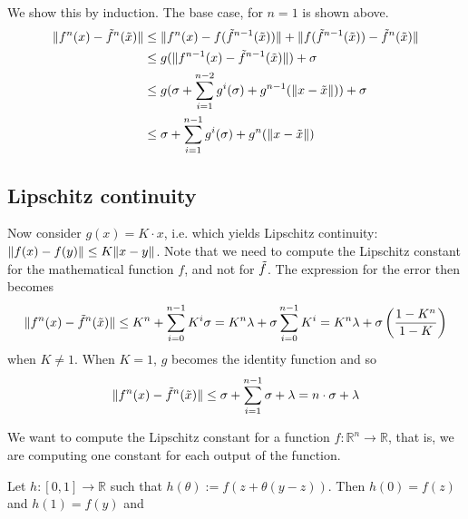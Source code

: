 We show this by induction. The base case, for $n = 1$ is shown above.
\begin{align}
\lVert  f^n(x) - \tilde{f}^n(\tilde{x})\rVert &\le
  \lVert f^n(x) - f(\tilde{f}^{n-1}(\tilde{x})) \rVert + \lVert f(\tilde{f}^{n-1}(\tilde{x})) - \tilde{f}^n(\tilde{x})\rVert \\
  &\le g(\lVert f^{n-1}(x) - \tilde{f}^{n-1}(\tilde{x}) \rVert) + \sigma \\
  &\le g (\sigma + \sum^{n - 2}_{i = 1} g^i(\sigma) + g^{n-1}(\lVert x - \tilde{x} \rVert)) + \sigma \\
  &\le \sigma + \sum^{n - 1}_{i = 1} g^i(\sigma) + g^n(\lVert x - \tilde{x} \rVert)
\end{align}

\subsection{Lipschitz continuity}
Now consider $g(x) = K \cdot x$, i.e. which yields Lipschitz continuity:
$\lVert f(x) - f(y) \rVert \le K \lVert x - y \rVert$.
Note that we need to compute the Lipschitz constant for the mathematical function $f$,
and not for $\tilde{f}$.
The expression for the error then becomes
\begin{align}
\lVert f^n(x) - \tilde{f}^n(\tilde{x})\rVert \le K^n + \sum^{n-1}_{i=0}K^i \sigma
  = K^n \lambda + \sigma \sum^{n-1}_{i=0} K^i
  = K^n \lambda + \sigma \left(\dfrac{1 - K^n}{1-K} \right)
\end{align}
when $K \ne 1$.
When $K = 1$, $g$ becomes the identity function and so
\begin{align}
\lVert f^n(x) - \tilde{f}^n(\tilde{x})\rVert \le \sigma + \sum^{n-1}_{i=1}\sigma + \lambda
= n \cdot \sigma + \lambda
\end{align}

We want to compute the Lipschitz constant for a function $f: \mathbb{R}^n \to \mathbb{R}$,
that is, we are computing one constant for each output of the function.

Let $h: [0, 1] \to \mathbb{R}$ such that $h(\theta) := f(z + \theta(y-z))$.
Then $h(0) = f(z)$ and $h(1) = f(y)$ and



